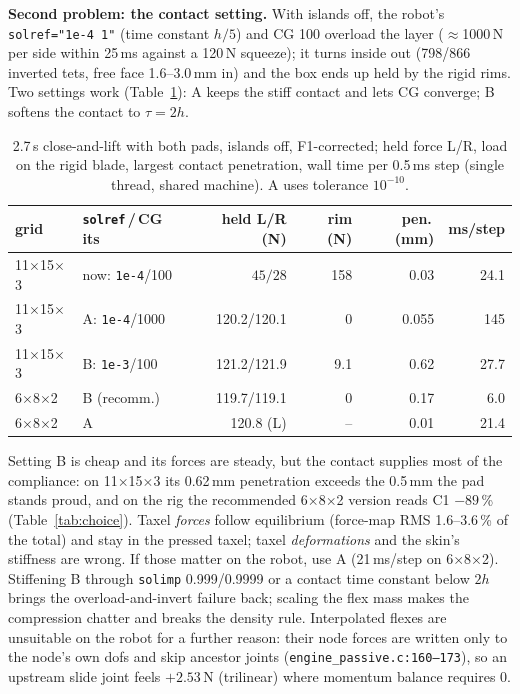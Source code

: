\documentclass[10pt,twocolumn]{article}
\newcommand{\code}[1]{\texttt{\small #1}}
\newcommand{\src}[1]{\texttt{\footnotesize #1}}
\begin{document}
\textbf{Second problem: the contact setting.} With islands off, the robot's \code{solref="1e-4 1"} (time constant
$h/5$) and CG 100 overload the layer ($\approx$1000\,N per side within 25\,ms against a 120\,N squeeze); it turns
inside out (798/866 inverted tets, free face 1.6--3.0\,mm in) and the box ends up held by the rigid rims. Two settings
work (Table~\ref{tab:robot}): A keeps the stiff contact and lets CG converge; B softens the contact to $\tau=2h$.

\begin{table}[t]\centering\footnotesize
\caption{2.7\,s close-and-lift with both pads, islands off, F1-corrected; held force L/R, load on the rigid blade,
largest contact penetration, wall time per 0.5\,ms step (single thread, shared machine). A uses tolerance $10^{-10}$.}
\label{tab:robot}
\setlength{\tabcolsep}{3pt}
\begin{tabular}{@{}llrrrr@{}}\toprule
grid & \code{solref}\,/\,CG its & held L/R (N) & rim (N) & pen.\,(mm) & ms/step\\\midrule
11$\times$15$\times$3 & now: \code{1e-4}/100 & $45/28$ & 158 & 0.03 & 24.1\\
11$\times$15$\times$3 & A: \code{1e-4}/1000 & 120.2/120.1 & 0 & 0.055 & 145\\
11$\times$15$\times$3 & B: \code{1e-3}/100 & 121.2/121.9 & 9.1 & 0.62 & 27.7\\
6$\times$8$\times$2 & B (recomm.) & 119.7/119.1 & 0 & 0.17 & 6.0\\
6$\times$8$\times$2 & A & 120.8 (L) & -- & 0.01 & 21.4\\\bottomrule
\end{tabular}
\end{table}

Setting B is cheap and its forces are steady, but the contact supplies most of the compliance: on 11$\times$15$\times$3
its 0.62\,mm penetration exceeds the 0.5\,mm the pad stands proud, and on the rig the recommended 6$\times$8$\times$2
version reads C1 $-89$\,\% (Table~\ref{tab:choice}). Taxel \emph{forces} follow equilibrium (force-map RMS 1.6--3.6\,\%
of the total) and stay in the pressed taxel; taxel \emph{deformations} and the skin's stiffness are wrong. If those
matter on the robot, use A (21\,ms/step on 6$\times$8$\times$2). Stiffening B through \code{solimp} 0.999/0.9999 or a
contact time constant below $2h$ brings the overload-and-invert failure back; scaling the flex mass makes the
compression chatter and breaks the density rule. Interpolated flexes are unsuitable on the robot for a further reason:
their node forces are written only to the node's own dofs and skip ancestor joints (\src{engine\_passive.c:160--173}),
so an upstream slide joint feels $+2.53$\,N (trilinear) where momentum balance requires 0.
\end{document}
